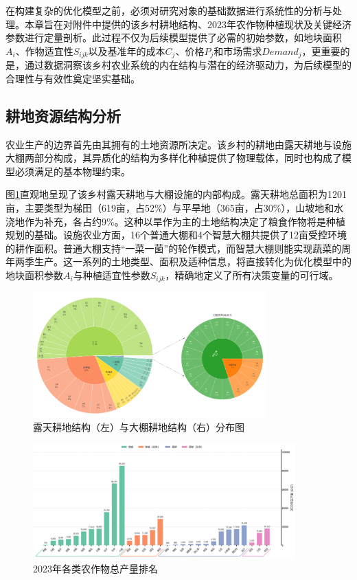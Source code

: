 \documentclass[withoutpreface,bwprint]{cumcmthesis} %
\begin{document}
在构建复杂的优化模型之前，必须对研究对象的基础数据进行系统性的分析与处理。本章旨在对附件中提供的该乡村耕地结构、2023年农作物种植现状及关键经济参数进行定量剖析。此过程不仅为后续模型提供了必需的初始参数，如地块面积$A_i$、作物适宜性$S_{ijk}$以及基准年的成本$C_j$、价格$P_j$和市场需求$Demand_j$，更重要的是，通过数据洞察该乡村农业系统的内在结构与潜在的经济驱动力，为后续模型的合理性与有效性奠定坚实基础。

\subsection{耕地资源结构分析}

农业生产的边界首先由其拥有的土地资源所决定。该乡村的耕地由露天耕地与设施大棚两部分构成，其异质化的结构为多样化种植提供了物理载体，同时也构成了模型必须满足的基本物理约束。

图\ref{fig:land_structure}直观地呈现了该乡村露天耕地与大棚设施的内部构成。露天耕地总面积为1201亩，主要类型为梯田（619亩，占52\%）与平旱地（365亩，占30\%），山坡地和水浇地作为补充，各占约9\%。这种以旱作为主的土地结构决定了粮食作物将是种植规划的基础。设施农业方面，16个普通大棚和4个智慧大棚共提供了12亩受控环境的耕作面积。普通大棚支持“一菜一菌”的轮作模式，而智慧大棚则能实现蔬菜的周年两季生产。这一系列的土地类型、面积及适种信息，将直接转化为优化模型中的地块面积参数$A_i$与种植适宜性参数$S_{ijk}$，精确地定义了所有决策变量的可行域。

\begin{figure}[t]
    \centering
    \includegraphics[width=0.8\textwidth]{figures/0_1.png}
    \caption{露天耕地结构（左）与大棚耕地结构（右）分布图}
    \label{fig:land_structure}
\end{figure}

\begin{figure}[h]
    \centering
    \includegraphics[width=0.9\textwidth]{figures/0_2.png}
    \caption{2023年各类农作物总产量排名}
    \label{fig:production_rank}
\end{figure}
\end{document}
